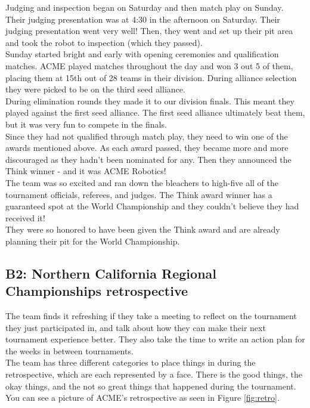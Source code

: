 \documentclass{article}
\begin{document}
Judging and inspection began on Saturday and then match play on Sunday. Their judging presentation was at 4:30 in the afternoon on Saturday. Their judging presentation went very well! Then, they went and set up their pit area and took the robot to inspection (which they passed). \\

Sunday started bright and early with opening ceremonies and qualification matches. ACME played matches throughout the day and won 3 out 5 of them, placing them at 15th out of 28 teams in their division. During alliance selection they were picked to be on the third seed alliance. \\

During elimination rounds they made it to our division finals. This meant they played against the first seed alliance. The first seed alliance ultimately beat them, but it was very fun to compete in the finals. \\

Since they had not qualified through match play, they need to win one of the awards mentioned above. As each award passed, they became more and more discouraged as they hadn't been nominated for any. Then they announced the Think winner - and it was ACME Robotics! \\

The team was so excited and ran down the bleachers to high-five all of the tournament officials, referees, and judges. The Think award winner has a guaranteed spot at the World Championship and they couldn't believe they had received it! \\

They were so honored to have been given the Think award and are already planning their pit for the World Championship. \\

\subsection{B2: Northern California Regional Championships retrospective}

The team finds it refreshing if they take a meeting to reflect on the tournament they just participated in, and talk about how they can make their next tournament experience better. They also take the time to write an action plan for the weeks in between tournaments. \\

The team has three different categories to place things in during the retrospective, which are each represented by a face. There is the good things, the okay things, and the not so great things that happened during the tournament. You can see a picture of ACME's retrospective as seen in Figure \ref{fig:retro}. \\
\end{document}
